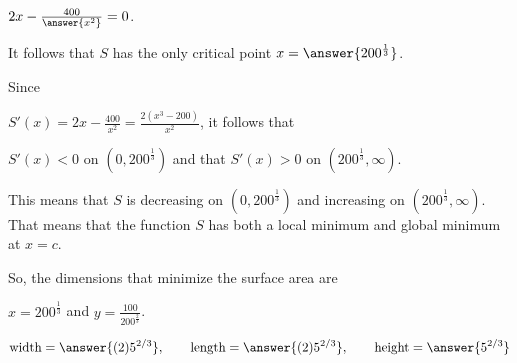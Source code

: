 \documentclass{ximera}
\begin{document}
\begin{exercise}
\begin{hint}
  $2x-\frac{400}{\answer{x^2}}=0$.
  
  It follows that $S$ has the only critical point  $x=\answer{200^{\frac{1}{3}}}$.
    \end{hint}
  
     \begin{hint}
     Since
    
     $S'(x)=2x-\frac{400}{x^{2}}=\frac{2(x^{3}-200)}{x^{2}}$, it follows that
    
      $S'(x)<0$ on $(0, 200^{\frac{1}{3}})$ and  that $S'(x)>0$ on $(200^{\frac{1}{3}},\infty)$.
     
      This means that $S$ is decreasing on $(0, 200^{\frac{1}{3}})$ and increasing on $(200^{\frac{1}{3}},\infty)$.
      That means that the function $S$ has both a local minimum and global minimum at $x=c$.
 \end{hint}
   

  \begin{hint}
  So, the dimensions that minimize the surface area are
  
  $x=200^{\frac{1}{3}}$ and $y=\frac{100}{200^{\frac{2}{3}}}$.
   \end{hint}
  \begin{prompt}
  \[
  \text{width}=\answer{(2) 5^{2/3}},\qquad
  \text{length}=\answer{(2) 5^{2/3}},\qquad
  \text{height}=\answer{5^{2/3}}
  \]
  \end{prompt}
\end{exercise}
\end{document}

